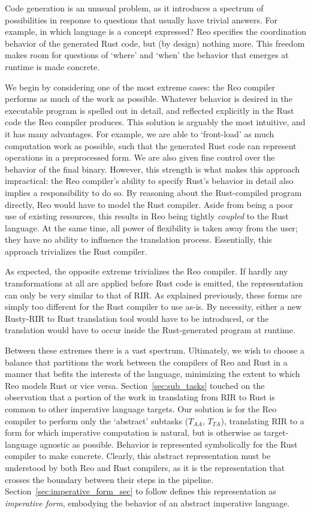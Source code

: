 Code generation is an unusual problem, as it introduces a spectrum of possibilities in response to questions that usually have trivial answers. For example, in which language is a concept expressed? Reo specifies the coordination behavior of the generated Rust code, but (by design) nothing more. This freedom makes room for questions of `where' and `when' the behavior that emerges at runtime is made concrete. 

We begin by considering one of the most extreme cases: the Reo compiler performs as much of the work as possible. Whatever behavior is desired in the executable program is spelled out in detail, and reflected explicitly in the Rust code the Reo compiler produces. This solution is arguably the most intuitive, and it has many advantages. For example, we are able to `front-load' as much computation work as possible, such that the generated Rust code can represent operations in a preprocessed form. We are also given fine control over the behavior of the final binary. However, this strength is what makes this approach impractical: the Reo compiler's ability to specify Rust's behavior in detail also implies a responsibility to do so. By reasoning about the Rust-compiled program directly, Reo would have to model the Rust compiler. Aside from being a poor use of existing resources, this results in Reo being tightly \textit{coupled} to the Rust language. At the same time, all power of flexibility is taken away from the user; they have no ability to influence the translation process. Essentially, this approach trivializes the Rust compiler.

As expected, the opposite extreme trivializes the Reo compiler. If hardly any transformations at all are applied before Rust code is emitted, the representation can only be very similar to that of RIR. As explained previously, these forms are simply too different for the Rust compiler to use as-is. By necessity, either a new Rusty-RIR to Rust translation tool would have to be introduced, or the translation would have to occur inside the Rust-generated program at runtime.

Between these extremes there is a vast spectrum. Ultimately, we wish to choose a balance that partitions the work between the compilers of Reo and Rust in a manner that befits the interests of the language, minimizing the extent to which Reo models Rust or vice versa. Section~\ref{sec:sub_tasks} touched on the observation that a portion of the work in translating from RIR to Rust is common to other imperative language targets. Our solution is for the Reo compiler to perform only the `abstract' subtasks ($T_{AA}$, $T_{TA}$), translating RIR to a form for which imperative computation is natural, but is otherwise as target-language agnostic as possible. Behavior is represented symbolically for the Rust compiler to make concrete. Clearly, this abstract representation must be understood by both Reo and Rust compilers, as it is the representation that crosses the boundary between their steps in the pipeline. Section~\ref{sec:imperative_form_sec} to follow defines this representation as \textit{imperative form}, embodying the behavior of an abstract imperative language.

